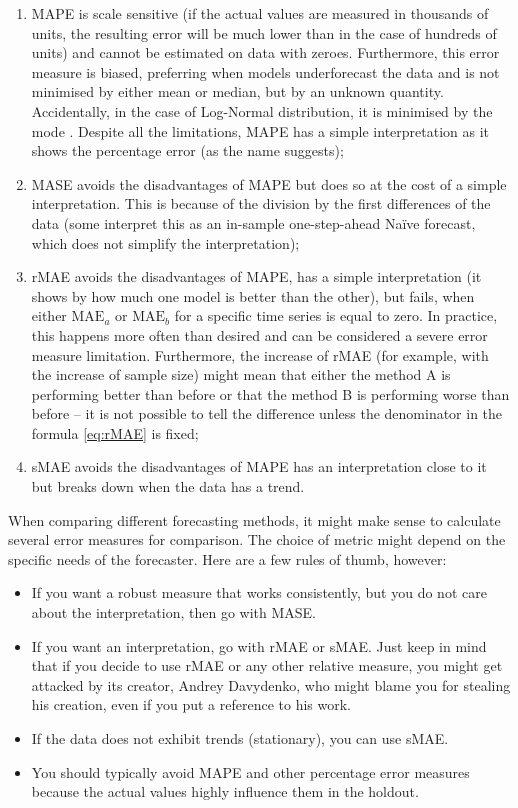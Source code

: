 \documentclass[
]{book}
\providecommand{\tightlist}{%
  \setlength{\itemsep}{0pt}\setlength{\parskip}{0pt}}
\theoremstyle{definition}
\theoremstyle{definition}
\theoremstyle{definition}
\theoremstyle{definition}
\theoremstyle{remark}
\begin{document}
\begin{enumerate}
\def\labelenumi{\arabic{enumi}.}
\tightlist
\item
  MAPE is scale sensitive (if the actual values are measured in thousands of units, the resulting error will be much lower than in the case of hundreds of units) and cannot be estimated on data with zeroes. Furthermore, this error measure is biased, preferring when models underforecast the data \citep[see, for example,][]{Makridakis1993} and is not minimised by either mean or median, but by an unknown quantity. Accidentally, in the case of Log-Normal distribution, it is minimised by the mode \citep[see discussion in][]{Kolassa2016}. Despite all the limitations, MAPE has a simple interpretation as it shows the percentage error (as the name suggests);
\item
  MASE avoids the disadvantages of MAPE but does so at the cost of a simple interpretation. This is because of the division by the first differences of the data (some interpret this as an in-sample one-step-ahead Naïve forecast, which does not simplify the interpretation);
\item
  rMAE avoids the disadvantages of MAPE, has a simple interpretation (it shows by how much one model is better than the other), but fails, when either \(\mathrm{MAE}_a\) or \(\mathrm{MAE}_b\) for a specific time series is equal to zero. In practice, this happens more often than desired and can be considered a severe error measure limitation. Furthermore, the increase of rMAE (for example, with the increase of sample size) might mean that either the method A is performing better than before or that the method B is performing worse than before -- it is not possible to tell the difference unless the denominator in the formula \eqref{eq:rMAE} is fixed;
\item
  sMAE avoids the disadvantages of MAPE has an interpretation close to it but breaks down when the data has a trend.
\end{enumerate}

When comparing different forecasting methods, it might make sense to calculate several error measures for comparison. The choice of metric might depend on the specific needs of the forecaster. Here are a few rules of thumb, however:

\begin{itemize}
\tightlist
\item
  If you want a robust measure that works consistently, but you do not care about the interpretation, then go with MASE.
\item
  If you want an interpretation, go with rMAE or sMAE. Just keep in mind that if you decide to use rMAE or any other relative measure, you might get attacked by its creator, Andrey Davydenko, who might blame you for stealing his creation, even if you put a reference to his work.
\item
  If the data does not exhibit trends (stationary), you can use sMAE.
\item
  You should typically avoid MAPE and other percentage error measures because the actual values highly influence them in the holdout.
\end{itemize}
\end{document}
